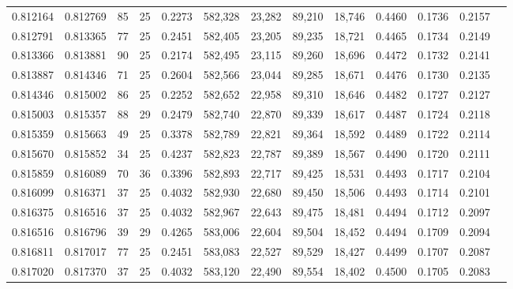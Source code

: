 \begin{tabular}{rrrrrrrrrrrrr}
0.812164 & 0.812769 &    85 &  25 &                                     0.2273 & 582,328 &  23,282 &  89,210 &  18,746 & 0.4460 & 0.1736 & 0.2157 \\
0.812791 & 0.813365 &    77 &  25 &                                     0.2451 & 582,405 &  23,205 &  89,235 &  18,721 & 0.4465 & 0.1734 & 0.2149 \\
0.813366 & 0.813881 &    90 &  25 &                                     0.2174 & 582,495 &  23,115 &  89,260 &  18,696 & 0.4472 & 0.1732 & 0.2141 \\
0.813887 & 0.814346 &    71 &  25 &                                     0.2604 & 582,566 &  23,044 &  89,285 &  18,671 & 0.4476 & 0.1730 & 0.2135 \\
0.814346 & 0.815002 &    86 &  25 &                                     0.2252 & 582,652 &  22,958 &  89,310 &  18,646 & 0.4482 & 0.1727 & 0.2127 \\
0.815003 & 0.815357 &    88 &  29 &                                     0.2479 & 582,740 &  22,870 &  89,339 &  18,617 & 0.4487 & 0.1724 & 0.2118 \\
0.815359 & 0.815663 &    49 &  25 &                                     0.3378 & 582,789 &  22,821 &  89,364 &  18,592 & 0.4489 & 0.1722 & 0.2114 \\
0.815670 & 0.815852 &    34 &  25 &                                     0.4237 & 582,823 &  22,787 &  89,389 &  18,567 & 0.4490 & 0.1720 & 0.2111 \\
0.815859 & 0.816089 &    70 &  36 &                                     0.3396 & 582,893 &  22,717 &  89,425 &  18,531 & 0.4493 & 0.1717 & 0.2104 \\
0.816099 & 0.816371 &    37 &  25 &                                     0.4032 & 582,930 &  22,680 &  89,450 &  18,506 & 0.4493 & 0.1714 & 0.2101 \\
0.816375 & 0.816516 &    37 &  25 &                                     0.4032 & 582,967 &  22,643 &  89,475 &  18,481 & 0.4494 & 0.1712 & 0.2097 \\
0.816516 & 0.816796 &    39 &  29 &                                     0.4265 & 583,006 &  22,604 &  89,504 &  18,452 & 0.4494 & 0.1709 & 0.2094 \\
0.816811 & 0.817017 &    77 &  25 &                                     0.2451 & 583,083 &  22,527 &  89,529 &  18,427 & 0.4499 & 0.1707 & 0.2087 \\
0.817020 & 0.817370 &    37 &  25 &                                     0.4032 & 583,120 &  22,490 &  89,554 &  18,402 & 0.4500 & 0.1705 & 0.2083 \\

\end{tabular}
